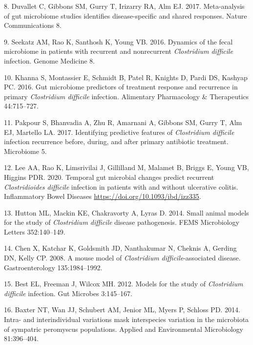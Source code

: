 \documentclass[
  11pt,
]{article}
\begin{document}
\leavevmode\hypertarget{ref-Duvallet2017}{}%
8. Duvallet C, Gibbons SM, Gurry T, Irizarry RA, Alm EJ. 2017.
Meta-analysis of gut microbiome studies identifies disease-specific and
shared responses. Nature Communications 8.

\leavevmode\hypertarget{ref-Seekatz2016}{}%
9. Seekatz AM, Rao K, Santhosh K, Young VB. 2016. Dynamics of the fecal
microbiome in patients with recurrent and nonrecurrent \emph{Clostridium
difficile} infection. Genome Medicine 8.

\leavevmode\hypertarget{ref-Khanna2016}{}%
10. Khanna S, Montassier E, Schmidt B, Patel R, Knights D, Pardi DS,
Kashyap PC. 2016. Gut microbiome predictors of treatment response and
recurrence in primary \emph{Clostridium difficile} infection. Alimentary
Pharmacology \& Therapeutics 44:715--727.

\leavevmode\hypertarget{ref-Pakpour2017}{}%
11. Pakpour S, Bhanvadia A, Zhu R, Amarnani A, Gibbons SM, Gurry T, Alm
EJ, Martello LA. 2017. Identifying predictive features of
\emph{Clostridium difficile} infection recurrence before, during, and
after primary antibiotic treatment. Microbiome 5.

\leavevmode\hypertarget{ref-Lee2020}{}%
12. Lee AA, Rao K, Limsrivilai J, Gillilland M, Malamet B, Briggs E,
Young VB, Higgins PDR. 2020. Temporal gut microbial changes predict
recurrent \emph{Clostridioides difficile} infection in patients with and
without ulcerative colitis. Inflammatory Bowel Diseases
\url{https://doi.org/10.1093/ibd/izz335}.

\leavevmode\hypertarget{ref-Hutton2014}{}%
13. Hutton ML, Mackin KE, Chakravorty A, Lyras D. 2014. Small animal
models for the study of \emph{Clostridium difficile} disease
pathogenesis. FEMS Microbiology Letters 352:140--149.

\leavevmode\hypertarget{ref-Chen2008}{}%
14. Chen X, Katchar K, Goldsmith JD, Nanthakumar N, Cheknis A, Gerding
DN, Kelly CP. 2008. A mouse model of \emph{Clostridium
difficile}-associated disease. Gastroenterology 135:1984--1992.

\leavevmode\hypertarget{ref-Best2012}{}%
15. Best EL, Freeman J, Wilcox MH. 2012. Models for the study of
\emph{Clostridium difficile} infection. Gut Microbes 3:145--167.

\leavevmode\hypertarget{ref-Baxter2014}{}%
16. Baxter NT, Wan JJ, Schubert AM, Jenior ML, Myers P, Schloss PD.
2014. Intra- and interindividual variations mask interspecies variation
in the microbiota of sympatric peromyscus populations. Applied and
Environmental Microbiology 81:396--404.
\end{document}
